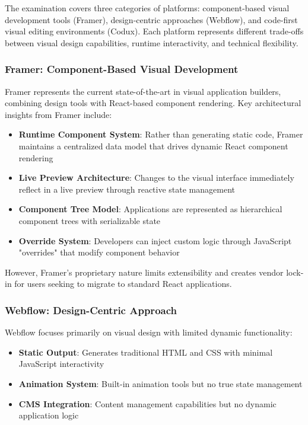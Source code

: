 \documentclass[oneside,12pt]{book}
\begin{document}
The examination covers three categories of platforms: component-based visual development tools (Framer), design-centric approaches (Webflow), and code-first visual editing environments (Codux). Each platform represents different trade-offs between visual design capabilities, runtime interactivity, and technical flexibility.

\subsubsection{Framer: Component-Based Visual Development}

Framer represents the current state-of-the-art in visual application builders, combining design tools with React-based component rendering. Key architectural insights from Framer include:

\begin{itemize}
    \item \textbf{Runtime Component System}: Rather than generating static code, Framer maintains a centralized data model that drives dynamic React component rendering
    \item \textbf{Live Preview Architecture}: Changes to the visual interface immediately reflect in a live preview through reactive state management
    \item \textbf{Component Tree Model}: Applications are represented as hierarchical component trees with serializable state
    \item \textbf{Override System}: Developers can inject custom logic through JavaScript "overrides" that modify component behavior
\end{itemize}

However, Framer's proprietary nature limits extensibility and creates vendor lock-in for users seeking to migrate to standard React applications.

\subsubsection{Webflow: Design-Centric Approach}

Webflow focuses primarily on visual design with limited dynamic functionality:

\begin{itemize}
    \item \textbf{Static Output}: Generates traditional \gls{HTML} and \gls{CSS} with minimal JavaScript interactivity
    \item \textbf{Animation System}: Built-in animation tools but no true state management
    \item \textbf{CMS Integration}: Content management capabilities but no dynamic application logic
\end{itemize}
\end{document}
